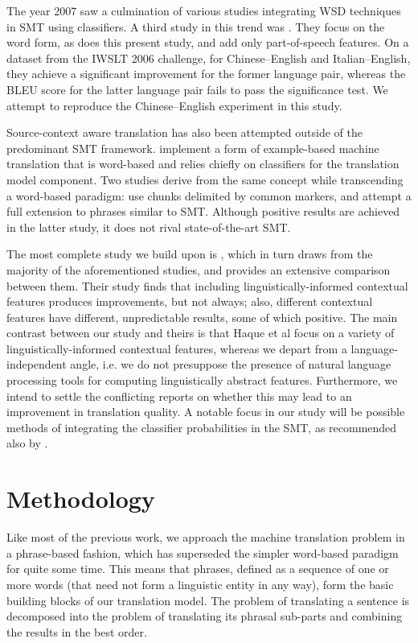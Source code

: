 The year 2007 saw a culmination of various studies integrating WSD techniques
in SMT using classifiers. A third study in this trend was \cite{Stroppa+07}.
They focus on the word form, as does this present study, and add only
part-of-speech features. On a dataset from the IWSLT 2006 challenge, for
Chinese--English and Italian--English, they achieve a significant improvement
for the former language pair, whereas the BLEU score for the latter language
pair fails to pass the significance test. We attempt to reproduce the
Chinese--English experiment in this study.

Source-context aware translation has also been attempted outside of the
predominant SMT framework. \cite{MBMT} implement a
form of example-based machine translation that is word-based and relies
chiefly on classifiers for the translation model component. Two studies derive
from the same concept while transcending a word-based paradigm:
\cite{MARKERBASED} use chunks delimited by common markers, and \cite{PBMBMT}
attempt a full extension to phrases similar to SMT. Although positive results
are achieved in the latter study, it does not rival state-of-the-art SMT.

The most complete study we build upon is \cite{Rejwanul+11}, which in turn
draws from the majority of the aforementioned studies, and provides an
extensive comparison between them. Their study finds that including
linguistically-informed contextual features produces improvements, but not
always; also, different contextual features have different, unpredictable
results, some of which positive. The main contrast between our study and theirs
is that Haque et al focus on a variety of linguistically-informed contextual
features, whereas we depart from a language-independent angle, i.e. we do not
presuppose the presence of natural language processing tools for computing
linguistically abstract features. Furthermore, we intend to settle the
conflicting reports on whether this may lead to an improvement in translation
quality. A notable focus in our study will be possible methods of integrating
the classifier probabilities in the SMT, as recommended also by
\cite{Gimenez+07}.


\section{Methodology}
\label{sec:methodology}

Like most of the previous work, we approach the machine translation
problem in a phrase-based fashion, which has superseded the simpler word-based
paradigm for quite some time. This means that phrases, defined as a
sequence of one or more words (that need not form a linguistic entity in any
way), form the basic building blocks of our translation model. The problem of
translating a sentence is decomposed into the problem of translating its phrasal
sub-parts and combining the results in the best order.

